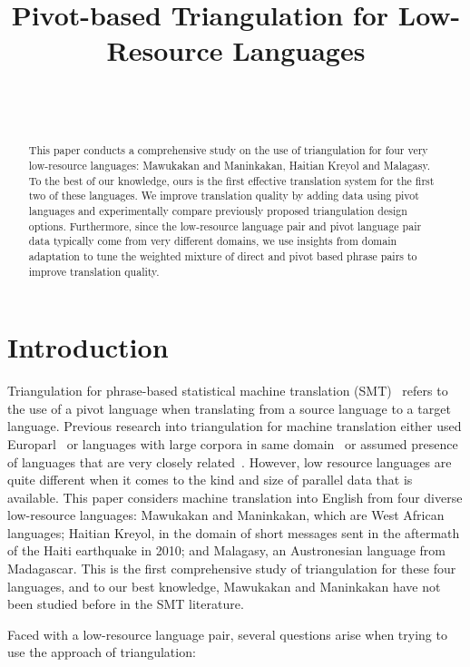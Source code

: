 \documentclass[11pt]{article}
\title{Pivot-based Triangulation for Low-Resource Languages}
\author{\name{\bf Rohit Dholakia} \hfill  \addr{rdholaki@cs.sfu.ca}\\ 
        \name{\bf Anoop Sarkar} \hfill \addr{anoop@cs.sfu.ca}\\ 
        \addr{School of Computing Science, \\ Simon Fraser University, \\
        Burnaby,  V5A 1S6, Canada}
}
\date{}
\begin{document}
\maketitle

\begin{abstract}
This paper conducts a comprehensive study on the use of triangulation for four very low-resource languages: Mawukakan and Maninkakan, Haitian Kreyol and Malagasy. To the best of our knowledge, ours is the first effective translation system for the first two of these languages. We improve translation quality by adding data using pivot languages and experimentally compare previously proposed triangulation design options. Furthermore, since the low-resource language pair and pivot language pair data typically come from very different domains, we use insights from domain adaptation to tune the weighted mixture of direct and pivot based phrase pairs to improve translation quality.
\end{abstract}

\section{Introduction}

Triangulation for phrase-based statistical machine translation (SMT)~\cite{Utiyama:07,Cohn:07,Wuwang:07} refers to the use of a pivot language when translating from a source language to a target language. Previous research into triangulation for machine translation either used Europarl~\cite{Cohn:07,Utiyama:07,Huck:12} or languages with large corpora in same domain~\cite{Gispert:06} or assumed presence of languages that are very closely related~\cite{Nakov:12,Nakovemnlp:12}. However, low resource languages are quite different when it comes to the kind and size of parallel data that is available. This paper considers machine translation into English from four diverse low-resource languages: Mawukakan and Maninkakan, which are West African languages; Haitian Kreyol, in the domain of short messages sent in the aftermath of the Haiti earthquake in 2010; and Malagasy, an Austronesian language from Madagascar. This is the first comprehensive study of triangulation for these four languages, and to our best knowledge, Mawukakan and Maninkakan have not been studied before in the SMT literature.

Faced with a low-resource language pair, several questions arise when trying to use the approach of triangulation:
\end{document}
